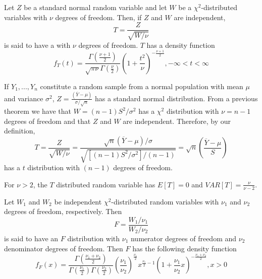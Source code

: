 \documentclass[12pt, a4paper, twoside, openright, titlepage]{book}
\begin{document}
\begin{defn}{}{}
    Let $Z$ be a standard normal random variable and let $W$ be a $\chi^2$-distributed variables with $\nu$ degrees of freedom. Then, if $Z$ and $W$ are independent, \begin{equation*}
        T= \frac{Z}{\sqrt{W/\nu}}
    \end{equation*}
    is said to have a  with $\nu$ degrees of freedom. $T$ has a density function \begin{equation*}
        f_T(t) = \frac{\Gamma\left(\frac{\nu+1}{2}\right)}{\sqrt{\pi\nu}\Gamma\left(\frac{\nu}{2}\right)}\left(1+\frac{t^2}{\nu}\right)^{-\frac{\nu+1}{2}}, -\infty < t < \infty
    \end{equation*}
\end{defn}

If $Y_1,...,Y_n$ constitute a random sample from a normal population with mean $\mu$ and variance $\sigma^2$, $Z = \frac{(\overline{Y}-\mu)}{\sigma/\sqrt{n}}$ has a standard normal distribution. From a previous theorem we have that $W = (n-1)S^2/\sigma^2$ has a $\chi^2$ distribution with $\nu = n-1$ degrees of freedom and that $Z$ and $W$ are independent. Therefore, by our definition, \begin{equation*}
    T = \frac{Z}{\sqrt{W/\nu}} = \frac{\sqrt{n}(\overline{Y}-\mu)/\sigma}{\sqrt{[(n-1)S^2/\sigma^2]/(n-1)}} = \sqrt{n}\left(\frac{\overline{Y} - \mu}{S}\right)
\end{equation*}
has a $t$ distribution with $(n-1)$ degrees of freedom.

\begin{rmk}{}{}
    For $\nu > 2$, the $T$ distributed random variable has $E[T] = 0$ and $VAR[T] = \frac{\nu}{\nu-2}$.
\end{rmk}

\begin{defn}{}{}
    Let $W_1$ and $W_2$ be independent $\chi^2$-distributed random variables with $\nu_1$ and $\nu_2$ degrees of freedom, respectively. Then \begin{equation*}
        F = \frac{W_1/\nu_1}{W_2/\nu_2}
    \end{equation*}
    is said to have an $F$ distribution with $\nu_1$ numerator degrees of freedom and $\nu_2$ denominator degrees of freedom. Then $F$ has the following density function \begin{equation*}
        f_F(x) = \frac{\Gamma\left(\frac{\nu_1+\nu_2}{2}\right)}{\Gamma\left(\frac{\nu_1}{2}\right)\Gamma\left(\frac{\nu_2}{2}\right)}\left(\frac{\nu_1}{\nu_2}\right)^{\frac{\nu_1}{2}}x^{\frac{\nu_1}{2}-1}\left(1+\frac{\nu_1}{\nu_2}x\right)^{-\frac{\nu_1+\nu_2}{2}}, x > 0
    \end{equation*}
\end{defn}
\end{document}

